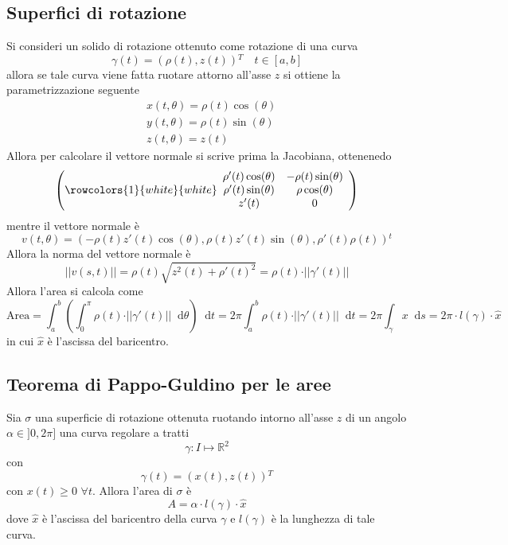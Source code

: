 \documentclass[a4paper]{extarticle}
\newcommand*\dif{\mathop{}\!\mathrm{d}}
\begin{document}
\subsection{Superfici di rotazione}
Si consideri un solido di rotazione ottenuto come rotazione di una curva
\[\gamma(t)=(\rho(t),z(t)){^T} \hspace{1em} t \in [a,b]\]
allora se tale curva viene fatta ruotare attorno all'asse $z$ si ottiene la parametrizzazione seguente
\begin{align*}
    &x(t,\theta)=\rho(t)\cos(\theta)\\
    &y(t,\theta)=\rho(t)\sin(\theta)\\
    &z(t,\theta)=z(t)
\end{align*}
Allora per calcolare il vettore normale si scrive prima la Jacobiana, ottenenedo
\[
    \left(
        \rowcolors{1}{white}{white}
        \begin{array}{cc}
            \rho'(t)\cos(\theta) & -\rho(t)\sin(\theta)\\
            \rho'(t)\sin(\theta) & \rho\cos(\theta)\\
            z'(t) & 0\\
        \end{array}
    \right)
\]
mentre il vettore normale è
\[v(t,\theta)=(-\rho(t) z'(t) \cos(\theta), \rho(t) z'(t) \sin(\theta), \rho'(t) \rho(t)){^t}\]
Allora la norma del vettore normale è
\[\vert \vert v(s,t) \vert \vert = \rho(t) \sqrt{z^2(t) + \rho'(t)^2} = \rho(t) \cdot \vert \vert \gamma'(t) \vert \vert\]
Allora l'area si calcola come
\[\text{Area} = \int_a^b \left(\int_0^\pi \rho(t) \cdot \vert \vert \gamma'(t) \vert \vert \dif \theta\right) \dif t = 2\pi \int_a^b \rho(t) \cdot \vert \vert \gamma'(t) \vert \vert \dif t = 2 \pi \int_\gamma x \dif s = 2\pi \cdot l(\gamma) \cdot \hat x\]
in cui $\hat x$ è l'ascissa del baricentro.

\vspace{1em}
\noindent
\subsection{Teorema di Pappo-Guldino per le aree}
Sia $\sigma$ una superficie di rotazione ottenuta ruotando intorno all'asse $z$ di un angolo $\alpha \in ]0,2\pi]$ una curva regolare a tratti
\[\gamma : I \longmapsto \mathbb{R}^2\]
con
\[\gamma(t)=(x(t),z(t)){^T}\]
con $x(t) \geq 0$ $\forall t$. Allora l'area di $\sigma$ è
\[A = \alpha \cdot l(\gamma) \cdot \hat x\]
dove $\hat x$  è l'ascissa del baricentro della curva $\gamma$ e $l(\gamma)$ è la lunghezza di tale curva.
\end{document}
